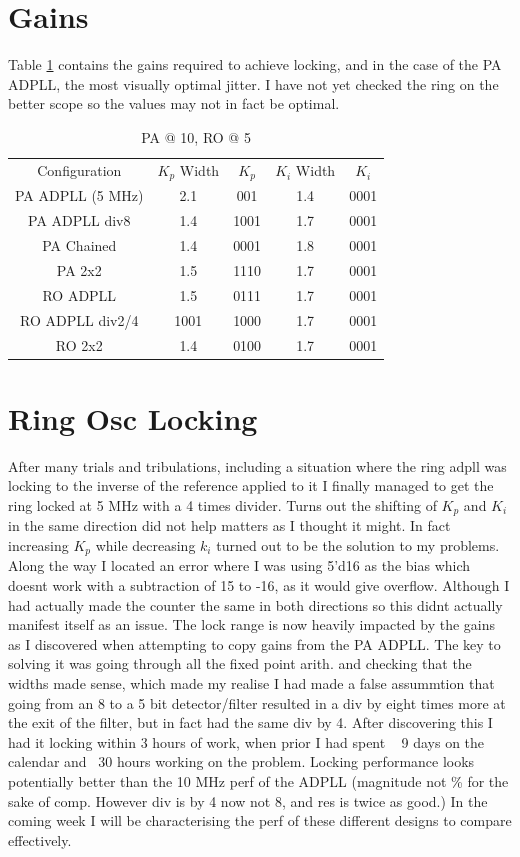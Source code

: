 \documentclass[a4paper,12pt]{report}
\begin{document}
\section*{Gains}
Table \ref{table:sdf} contains the gains required to achieve locking, and in the case of the PA ADPLL, the most visually optimal jitter. I have not yet checked the ring on the better scope so the values may not in fact be optimal.
\begin{table}[!ht]
	\begin{center} 
		\begin{tabular}{c|c|c|c|c}           
			Configuration & $K_p$ Width & $K_p$ & $K_i$ Width & $K_i$ \\
			PA ADPLL (5 MHz) & 2.1 & 001  & 1.4 & 0001 \\
			PA ADPLL div8 & 1.4 & 1001 & 1.7 & 0001 \\
			PA Chained & 1.4 & 0001 & 1.8 & 0001 \\
			PA 2x2 & 1.5 & 1110 & 1.7 & 0001 \\
			RO ADPLL & 1.5 & 0111 & 1.7 & 0001 \\
			RO ADPLL div2/4 & 1001 & 1000 & 1.7 & 0001 \\
            RO 2x2 & 1.4 & 0100 & 1.7 & 0001 \\
		\end{tabular}
		\caption{PA @ 10, RO @ 5}
		\label{table:sdf}
	\end{center}
\end{table}
	
\section*{Ring Osc Locking}
After many trials and tribulations, including a situation where the ring adpll was locking to the inverse of the reference applied to it I finally managed to get the ring locked at 5 MHz with a 4 times divider. Turns out the shifting of $K_p$ and $K_i$ in the same direction did not help matters as I thought it might.
In fact increasing $K_p$ while decreasing $k_i$ turned out to be the solution to my problems.
Along the way I located an error where I was using 5'd16 as the bias which doesnt work with a subtraction of 15 to -16, as it would give overflow. Although I had actually  made the counter the same in both directions so this didnt actually manifest itself as an issue.
The lock range is now heavily impacted by the gains as I discovered when attempting to copy gains from the PA ADPLL.
The key to solving it was going through all the fixed point arith. and checking that the widths made sense, which made my realise I had made a false assummtion that going from an 8 to a 5 bit detector/filter resulted in a div by eight times more at the exit of the filter, but in fact had the same div by 4.
After discovering this I had it locking within 3 hours of work, when prior I had spent ~ 9 days on the calendar and ~30 hours working on the problem. Locking performance looks potentially better than the 10 MHz perf of the ADPLL (magnitude not \% for the sake of comp. However div is by 4 now not 8, and res is twice as good.) In the coming week I will be characterising the perf of these different designs to compare effectively.
\end{document}
